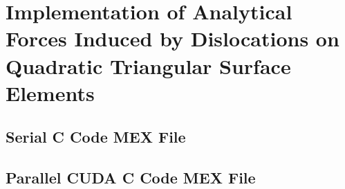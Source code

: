 \chapter{Implementation of Analytical Forces Induced by Dislocations on Quadratic Triangular Surface Elements}
	\section{Serial C Code MEX File}
	\section{Parallel CUDA C Code MEX File}
